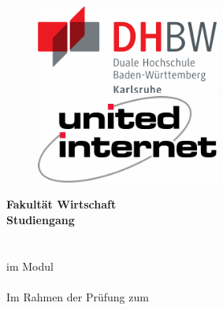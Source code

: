 
\begin{titlepage}

    \centering
    \vspace*{-3cm}

    \begin{figure}[h!]
        \centering
        \includegraphics[width=6cm]{config/logo_dhbw.pdf}
        \ifseminararbeit
        \else
            \hspace{1cm}
            \includegraphics[width=6cm]{config/logo_united-internet.pdf}
        \fi
        \vspace{0.5cm}
    \end{figure}

    \large \textbf{Fakultät Wirtschaft} \\
    \vspace{0.5cm}
    \large \textbf{Studiengang \courseOfStudies} \\

    \vfill  %
    \LARGE \textbf {\thesisTitle} \\

    \vfill  %
    \Large \textbf{\thesisType} \\
    \ifseminararbeit
        \Large im Modul \\
        \textbf{\module} \\
        \vspace{0.3cm}
    \else
        \vspace{1cm}
    \fi
    \normalsize Im Rahmen der Prüfung zum \degree \\


\end{titlepage}
